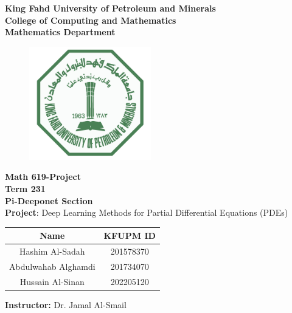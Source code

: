 \graphicspath{{./images}}

\begin{center}
    \doublespacing
    {\Large \textbf{King Fahd University of Petroleum and Minerals} }\\ 
    {\large \textbf{
    College of Computing and Mathematics\\
    Mathematics Department 
    } } 
\end{center} 

\begin{figure}[h]
    \centering
    \includegraphics[width=200px]{images/KFUPM_LOGO}
\end{figure}

\begin{center}\onehalfspacing
    \Large \textbf{Math 619-Project}\\
    \normalsize \textbf{Term 231} \\
    \Large \textbf{Pi-Deeponet Section}\\
    \textbf{Project}: Deep Learning Methods for Partial Differential Equations (PDEs)
\end{center}
\vspace{1em}
\large
\begin{center}
\bgroup
\def\arraystretch{1.3}
\begin{tabular}{|c|c|}
    \hline
    \textbf{Name} & \textbf{KFUPM ID} \\
    \hline
    Hashim Al-Sadah & 201578370\\
    \hline
    Abdulwahab Alghamdi & 201734070\\
    \hline
    Hussain Al-Sinan & 202205120\\
    \hline 
\end{tabular}
\egroup
\end{center}
\vspace{1em}
\begin{center}
    \textbf{Instructor:} Dr. Jamal Al-Smail
\end{center}
\normalsize

